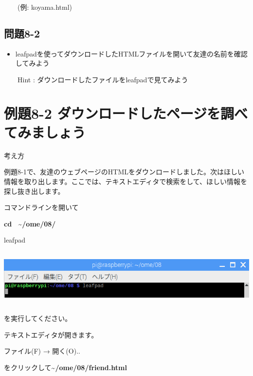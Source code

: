 \documentclass[a4paper,12pt,dvipdfmx]{jarticle}
\begin{document}
\ \ \ \ (例: koyama.html) 

\subsection*{問題8-2}
\begin{itemize}
\item
leafpadを使ってダウンロードしたHTMLファイルを開いて友達の名前を確認してみよう
\end{itemize}
\ \ \ \ Hint :
ダウンロードしたファイルをleafpadで見てみよう

\clearpage\section{例題8-2
ダウンロードしたページを調べてみましょう}
考え方

例題8-1で、友達のウェブページのHTMLをダウンロードしました。次はほしい情報を取り出します。ここでは、テキストエディタで検索をして、ほしい情報を探し抜き出します。

コマンドラインを開いて

\textbf{cd \ \~{}/ome/08/}

leafpad 



\begin{center}
\includegraphics[width=17.006cm,height=2.87cm]{textbook-img006.png}

\end{center}
を実行してください。

テキストエディタが開きます。

ファイル(F) → 開く(O).. 

をクリックして\textbf{\~{}/ome/08/friend.html}
\end{document}
